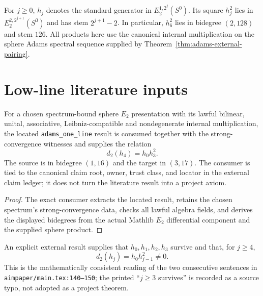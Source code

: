 \begin{definition}
  \label{def:adams-hj}
  \notready
  For $j\ge0$, $h_j$ denotes the standard generator in
  $E_2^{1,2^j}(S^0)$.  Its square $h_j^2$ lies in
  $E_2^{2,2^{j+1}}(S^0)$ and has stem $2^{j+1}-2$.  In particular,
  $h_6^2$ lies in bidegree $(2,128)$ and stem $126$.  All products here use
  the canonical internal multiplication on the sphere Adams spectral sequence
  supplied by Theorem~\ref{thm:adams-external-pairing}.
\end{definition}

\section{Low-line literature inputs}

\begin{theorem}
  \label{thm:external-adams-h4-d2-slice}
  \leanok
  For a chosen spectrum-bound sphere $E_2$ presentation with its lawful
  bilinear, unital, associative, Leibniz-compatible and nondegenerate
  internal multiplication, the located \texttt{adams\_one\_line} result is
  consumed together with the strong-convergence witnesses and supplies the
  relation
  \[
    d_2(h_4)=h_0h_3^2.
  \]
  The source is in bidegree $(1,16)$ and the target in $(3,17)$.  The consumer
  is tied to the canonical claim root, owner, trust class, and locator in the
  external claim ledger; it does not turn the literature result into a project
  axiom.
\end{theorem}

\begin{proof}
  The exact consumer extracts the located result, retains the chosen
  spectrum's strong-convergence data, checks all lawful algebra fields, and
  derives the displayed bidegrees from the actual Mathlib $E_2$ differential
  component and the supplied sphere product.
\end{proof}

\begin{theorem}
  \label{thm:external-adams-one-line}
  \notready
  An explicit external result supplies that $h_0,h_1,h_2,h_3$ survive and
  that, for $j\ge4$,
  \[
    d_2(h_j)=h_0h_{j-1}^2\ne0.
  \]
  This is the mathematically consistent reading of the two consecutive
  sentences in \texttt{aimpaper/main.tex:140--150}; the printed ``$j\ge3$
  survives'' is recorded as a source typo, not adopted as a project theorem.
\end{theorem}

